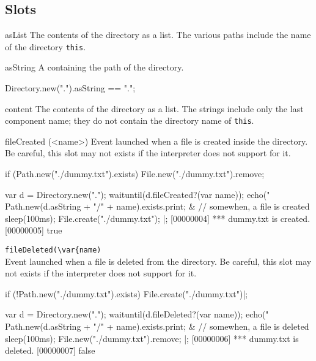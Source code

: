 \subsection{Slots}
\begin{urbiscriptapi}
\item[asList]
  The contents of the directory as a  list.  The
  various paths include the name of the directory \lstinline|this|.

\item[asString] A  containing the path of the directory.

\begin{urbiassert}
Directory.new(".").asString == ".";
\end{urbiassert}


\item[content]
  The contents of the directory as a  list.  The
  strings include only the last component name; they do not contain
  the directory name of \lstinline|this|.

\item[fileCreated](<name>)%
  Event launched when a file is created inside the directory.  Be careful,
  this slot may not exists if the \us interpreter does not support for it.

\begin{urbiscript}[firstnumber=1]
if (Path.new("./dummy.txt").exists)
  File.new("./dummy.txt").remove;

{
  var d = Directory.new(".");
  waituntil(d.fileCreated?(var name));
  echo("%
  Path.new(d.asString + "/" + name).exists.print;
} & {
  // somewhen, a file is created
  sleep(100ms);
  File.create("./dummy.txt");
}|;
[00000004] *** dummy.txt is created.
[00000005] true
\end{urbiscript}

\item \lstinline|fileDeleted(\var{name)|\\
  Event launched when a file is deleted from the directory.  Be careful,
  this slot may not exists if the \us interpreter does not support for it.

\begin{urbiscript}
if (!Path.new("./dummy.txt").exists)
  File.create("./dummy.txt")|;

{
  var d = Directory.new(".");
  waituntil(d.fileDeleted?(var name));
  echo("%
  Path.new(d.asString + "/" + name).exists.print;
} & {
  // somewhen, a file is deleted
  sleep(100ms);
  File.new("./dummy.txt").remove;
}|;
[00000006] *** dummy.txt is deleted.
[00000007] false
\end{urbiscript}


\end{urbiscriptapi}


